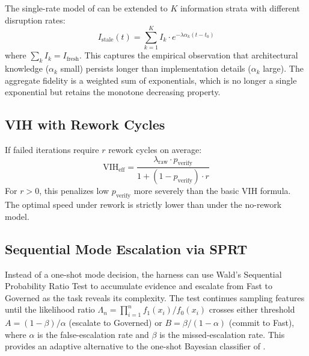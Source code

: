 \documentclass[11pt, a4paper, logo, copyright]{googledeepmind}
\newcommand{\VIH}{\mathrm{VIH}}
\begin{document}
\begin{appendices}
The single-rate model of  can be extended to $K$ information strata with different disruption rates:
\[
    I_{\mathrm{stale}}(t) = \sum_{k=1}^K I_k \cdot e^{-\lambda\alpha_k(t - t_0)}
\]
where $\sum_k I_k = I_{\mathrm{fresh}}$. This captures the empirical observation that architectural knowledge ($\alpha_k$ small) persists longer than implementation details ($\alpha_k$ large). The aggregate fidelity is a weighted sum of exponentials, which is no longer a single exponential but retains the monotone decreasing property.

\subsection{VIH with Rework Cycles}

If failed iterations require $r$ rework cycles on average:
\[
    \VIH_{\mathrm{eff}} = \frac{\lambda_{\mathrm{raw}} \cdot p_{\mathrm{verify}}}{1 + (1 - p_{\mathrm{verify}}) \cdot r}
\]
For $r > 0$, this penalizes low $p_{\mathrm{verify}}$ more severely than the basic VIH formula. The optimal speed under rework is strictly lower than under the no-rework model.

\subsection{Sequential Mode Escalation via SPRT}

Instead of a one-shot mode decision, the harness can use Wald's Sequential Probability Ratio Test to accumulate evidence and escalate from Fast to Governed as the task reveals its complexity. The test continues sampling features until the likelihood ratio $\Lambda_n = \prod_{i=1}^n f_1(x_i)/f_0(x_i)$ crosses either threshold $A = (1 - \beta)/\alpha$ (escalate to Governed) or $B = \beta/(1-\alpha)$ (commit to Fast), where $\alpha$ is the false-escalation rate and $\beta$ is the missed-escalation rate. This provides an adaptive alternative to the one-shot Bayesian classifier of .

\end{appendices}



\end{document}
